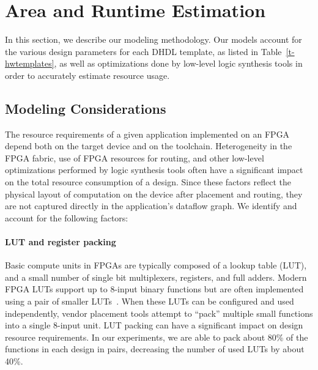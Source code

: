 \section{Area and Runtime Estimation}
\label{sec:modeling}
In this section, we describe our modeling methodology. Our models account for the various
design parameters for each DHDL template, as listed in Table~\ref{t-hwtemplates}, as well as optimizations done by low-level logic
synthesis tools in order to accurately estimate resource usage.

\subsection{Modeling Considerations}
\label{ss:modeling-con}
The resource requirements of a given application implemented on an FPGA depend both on the target device and on the toolchain.
Heterogeneity in the FPGA fabric, use of FPGA resources for routing, and other low-level optimizations performed by logic
synthesis tools often have a significant impact on the total resource consumption of a design. Since these factors reflect
the physical layout of computation on the device after placement and routing, they are not captured directly in the application's dataflow graph.
We identify and account for the following factors:

\paragraph{LUT and register packing} Basic compute units in FPGAs are typically composed of a lookup table (LUT), and a small number of single bit multiplexers, registers, and full adders.
  Modern FPGA LUTs support up to 8-input binary functions but are often implemented using a pair of smaller LUTs~\cite{stratixv,virtex7}.
  When these LUTs can be configured and used independently, vendor placement tools attempt to ``pack'' multiple small functions into a single 8-input unit.
  LUT packing can have a significant impact on design resource requirements.
  In our experiments, we are able to pack about 80\% of the functions in each design in pairs, decreasing the number of used LUTs by about 40\%.

